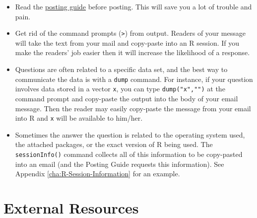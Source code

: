 \documentclass[captions=tableheading]{scrbook}
\begin{document}
\begin{itemize}
\item Read the \href{http://www.r-project.org/posting-guide.html}{posting guide} before posting. This will save you a lot of trouble and pain.
\item Get rid of the command prompts (\texttt{>}) from output. Readers of your message will take the text from your mail and copy-paste into an \textsf{R} session. If you make the readers' job easier then it will increase the likelihood of a response.
\item Questions are often related to a specific data set, and the best way to communicate the data is with a \texttt{dump} command. For instance, if your question involves data stored in a vector \texttt{x}, you can type \texttt{dump("x","")} at the command prompt and copy-paste the output into the body of your email message. Then the reader may easily copy-paste the message from your email into \textsf{R} and \texttt{x} will be available to him/her.
\item Sometimes the answer the question is related to the operating system used, the attached packages, or the exact version of \textsf{R} being used. The \texttt{sessionInfo()} command collects all of this information to be copy-pasted into an email (and the Posting Guide requests this information). See Appendix \ref{cha:R-Session-Information} for an example.
\end{itemize}
\section{External Resources}
\label{sec-2-5}
\end{document}
